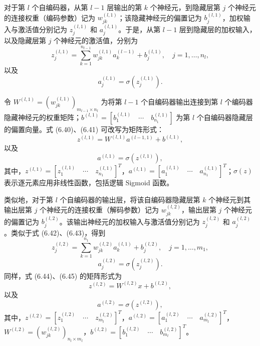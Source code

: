 对于第 $l$ 个自编码器，从第 $l-1$ 层输出的第 $k$ 个神经元，到隐藏层第 $j$ 个神经元的连接权重（编码参数）记为 $w_{jk}^{(l,1)}$；该隐藏神经元的偏置记为 $b_j^{(l,1)}$，加权输入与激活值分别记为 $z_j^{(l,1)}$ 和 $a_j^{(l,1)}$。于是，从第 $l-1$ 层到隐藏层的加权输入，以及隐藏层第 $j$ 个神经元的激活值，分别为
\begin{equation}
z_j^{(l,1)}=\sum_{k=1}^{n_{l-1}}w_{jk}^{(l,1)}a_k^{(l-1)}+b_j^{(l,1)},\quad j=1,\ldots,n_l,
\tag{6.40}
\end{equation}
以及
\begin{equation}
a_j^{(l,1)}=\sigma(z_j^{(l,1)}).
\tag{6.41}
\end{equation}


令 $W^{(l,1)}=(w_{jk}^{(l,1)})_{m_{l-1}\times n_l}$ 为将第 $l-1$ 个自编码器输出连接到第 $l$ 个编码器隐藏神经元的权重矩阵；$b^{(l,1)}=[b_1^{(l,1)}\quad\cdots\quad b_{n_1}^{(l,1)}]$ 为第 $l$ 个自编码器隐藏层的偏置向量。式 (6.40)、(6.41) 可改写为矩阵形式：
\begin{equation}
z^{(l,1)}=W^{(l,1)}a^{(l-1,1)}+b^{(l,1)},
\tag{6.42}
\end{equation}
以及
\begin{equation}
a^{(l,1)}=\sigma(z^{(l,1)}),
\tag{6.43}
\end{equation}
其中，$z^{(l,1)}=[z_1^{(l,1)}\quad\cdots\quad z_{n_1}^{(l,1)}]^T$，$a^{(l,1)}=[a_1^{(l,1)}\quad\cdots\quad a_{n_1}^{(l,1)}]^T$；$\sigma(z)$ 表示逐元素应用非线性函数，包括逻辑 Sigmoid 函数。

类似地，对于第 $l$ 个自编码器的输出层，将该自编码器隐藏层第 $k$ 个神经元到其输出层第 $j$ 个神经元的连接权重（解码参数）记为 $w_{jk}^{(l,2)}$，输出层第 $j$ 个神经元的偏置记为 $b_j^{(l,2)}$。该输出神经元的加权输入与激活值分别记为 $z_j^{(l,2)}$ 和 $a_j^{(l,2)}$。类似于式 (6.42)、(6.43)，得到
\begin{equation}
z_j^{(l,2)}=\sum_{k=1}^{n_1}w_{jk}^{(l,2)}a_k^{(l,1)}+b_j^{(l,2)},\quad j=1,\ldots,m_1,
\tag{6.44}
\end{equation}
\begin{equation}
a_j^{(l,2)}=\sigma(z_j^{(l,2)}).
\tag{6.45}
\end{equation}
同样，式 (6.44)、(6.45) 的矩阵形式为
\begin{equation}
z^{(l,2)}=W^{(l,2)}x+b^{(l,2)},
\tag{6.46}
\end{equation}
以及
\begin{equation}
a^{(l,2)}=\sigma(z^{(l,2)}),
\tag{6.47}
\end{equation}
其中，$z^{(l,2)}=[z_1^{(l,2)}\quad\cdots\quad z_{m_l}^{(l,2)}]^T$，$a^{(l,2)}=[a_1^{(l,2)}\quad\cdots\quad a_{m_l}^{(l,2)}]^T$，$W^{(l,2)}=(w_{jk}^{(l,2)})_{n_l\times m_l}$，$b^{(l,2)}=[b_1^{(l,2)}\quad\cdots\quad b_{m_l}^{(l,2)}]^T$。
